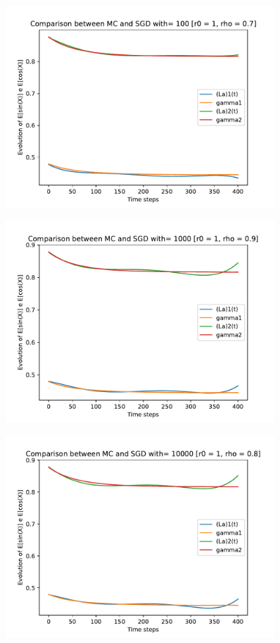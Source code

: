 \documentclass[a4paper,11pt,openright]{report}
\begin{document}
\begin{figure}[H]
\centering
\includegraphics[width=0.9\textwidth]{images/graphics T = 4/n = 5, M = 100 sine and cosine.pdf}
\end{figure}
\begin{figure}[H]
\centering
\includegraphics[width=0.9\textwidth]{images/graphics T = 4/n = 5, M = 1000 sine and cosine.pdf}
\end{figure}
\begin{figure}[H]
\centering
\includegraphics[width=0.9\textwidth]{images/graphics T = 4/n = 5, M = 10000 sine and cosine.pdf}
\end{figure}
\newpage
\end{document}
